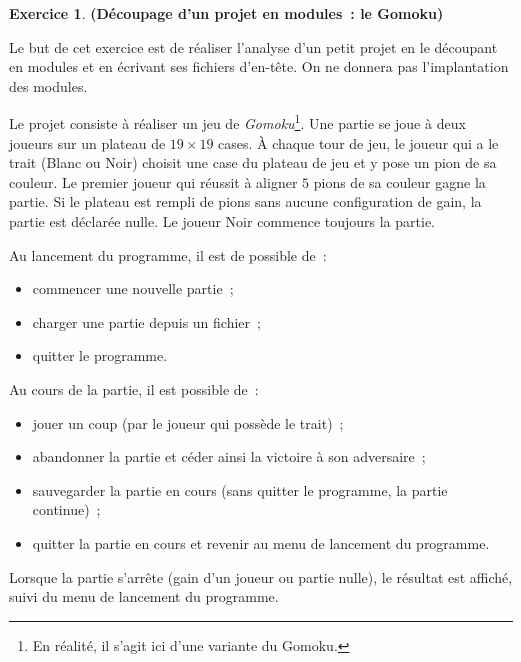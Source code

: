 \documentclass[12pt]{article}
\theoremstyle{definition}
\newtheorem{Exercice}{Exercice}
\begin{document}
\begin{Exercice} {\bf (Découpage d'un projet en modules~: le Gomoku)}\smallskip

Le but de cet exercice est de réaliser l'analyse d'un petit projet en le
découpant en modules et en écrivant ses fichiers d'en-tête. On ne donnera
pas l'implantation des modules.
\smallskip

Le projet consiste  à réaliser un jeu de {\em Gomoku}\footnote{En réalité,
il  s'agit ici d'une variante du Gomoku.}. Une partie se joue à deux joueurs
sur un plateau de $19 \times 19$ cases. À chaque tour de jeu, le joueur
qui a le trait (Blanc ou Noir) choisit une case du plateau de jeu et y
pose un pion de sa couleur. Le premier joueur qui réussit à aligner $5$
pions de sa couleur gagne la partie. Si le plateau est rempli de pions
sans aucune configuration de gain, la partie est déclarée nulle. Le joueur
Noir commence toujours la partie.
\smallskip

Au lancement du programme, il est de possible de~:
\begin{itemize}
    \item commencer une nouvelle partie~;
    \smallskip

    \item charger une partie depuis un fichier~;
    \smallskip

    \item quitter le programme.
\end{itemize}
Au cours de la partie, il est possible de~:
\begin{itemize}
    \item jouer un coup (par le joueur qui possède le trait)~;
    \smallskip

    \item abandonner la partie et céder ainsi la victoire à son
    adversaire~;
    \smallskip

    \item sauvegarder la partie en cours (sans quitter le programme, la
    partie continue)~;
    \smallskip

    \item quitter la partie en cours et revenir au menu de lancement du
    programme.
\end{itemize}
Lorsque la partie s'arrête (gain d'un joueur ou partie nulle), le résultat
est affiché, suivi du menu de lancement du programme.
\smallskip


\end{Exercice}
\end{document}

